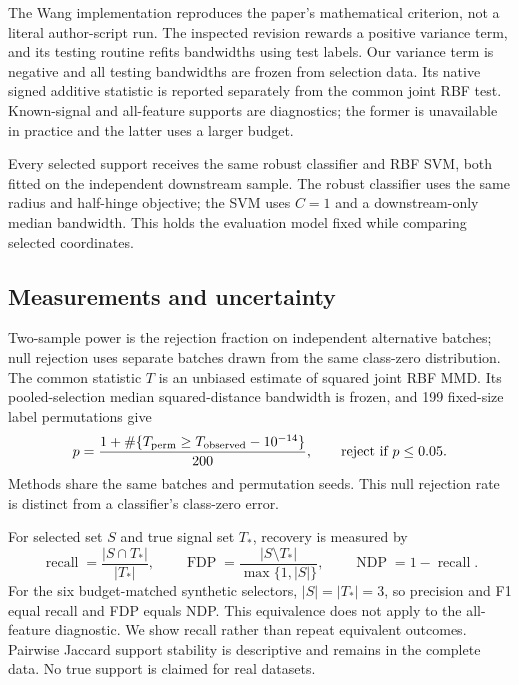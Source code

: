 \documentclass[11pt,a4paper]{article}
\begin{document}
The Wang implementation reproduces the paper's mathematical criterion, not a
literal author-script run. The inspected revision rewards a positive variance
term, and its testing routine refits bandwidths using test labels. Our variance
term is negative and all testing bandwidths are frozen from selection data.
Its native signed additive statistic is reported separately from the common
joint RBF test. Known-signal and all-feature supports are diagnostics; the former
is unavailable in practice and the latter uses a larger budget.

Every selected support receives the same robust classifier and RBF SVM, both fitted
on the independent downstream sample. The robust classifier uses the same radius
and half-hinge objective; the SVM uses $C=1$ and a downstream-only median bandwidth.
This holds the evaluation model fixed while comparing selected coordinates.

\subsection{Measurements and uncertainty}
Two-sample power is the rejection fraction on independent alternative batches;
null rejection uses separate batches drawn from the same class-zero distribution.
The common statistic $T$ is an unbiased estimate of squared joint RBF MMD. Its pooled-selection median
squared-distance bandwidth is frozen, and 199 fixed-size label permutations give
\begin{equation}\label{eq:permutation}
p=\frac{1+\#\{T_{\rm perm}\ge T_{\rm observed}-10^{-14}\}}{200},\qquad
\text{reject if }p\le0.05.
\end{equation}
Methods share the same batches and permutation seeds. This null rejection rate
is distinct from a classifier's class-zero error.

For selected set $S$ and true signal set $T_*$, recovery is measured by
\begin{equation}\label{eq:recovery}
\operatorname{recall}=\frac{|S\cap T_*|}{|T_*|},\qquad
\operatorname{FDP}=\frac{|S\setminus T_*|}{\max\{1,|S|\}},\qquad
\operatorname{NDP}=1-\operatorname{recall}.
\end{equation}
For the six budget-matched synthetic selectors, $|S|=|T_*|=3$,
so precision and F1 equal recall and FDP equals NDP. This equivalence does
not apply to the all-feature diagnostic. We show recall rather than repeat equivalent outcomes. Pairwise
Jaccard support stability is descriptive and remains in the complete data.
No true support is claimed for real datasets.
\end{document}
